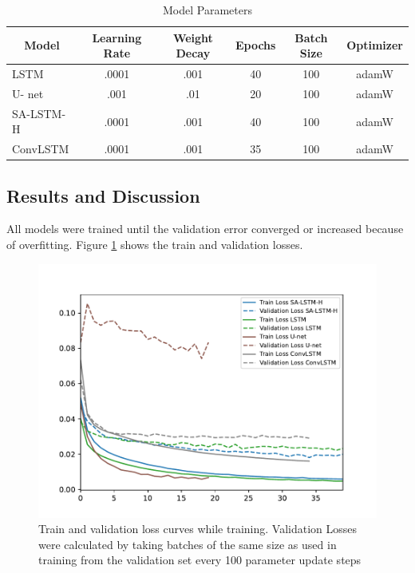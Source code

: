 \documentclass[12pt]{article}
\begin{document}
\begin{table}[h]
	\caption{Model Parameters}
	\label{modelPars1}
	\begin{tabular}{lccccc}
		\toprule
		\multicolumn{1}{c}{\textbf{Model}} & \textbf{Learning Rate} & \textbf{Weight Decay} & \textbf{Epochs} & \textbf{Batch Size} & \textbf{Optimizer} \\ 
		\midrule
		LSTM & .0001 & .001 & 40 & 100 & adamW \\
		U- net & .001 & .01 & 20 & 100 & adamW \\
		SA-LSTM-H & .0001 & .001 & 40 & 100 & adamW \\
		ConvLSTM & .0001 & .001 & 35 & 100 & adamW \\
		\bottomrule
	\end{tabular}
\end{table}

\subsection{Results and Discussion}
All models were trained until the validation error converged or increased because of overfitting. Figure \ref{fig:figure5} shows the train and validation losses.
\begin{figure}[H]
	
	\centering
	\includegraphics[scale = 1]{trainCurves.pdf}\hfill
	
	\caption{Train and validation loss curves while training. Validation Losses were calculated by taking batches of the same size as used in training from the validation set every 100 parameter update steps}
	\label{fig:figure5}
	
\end{figure} 
\end{document}
